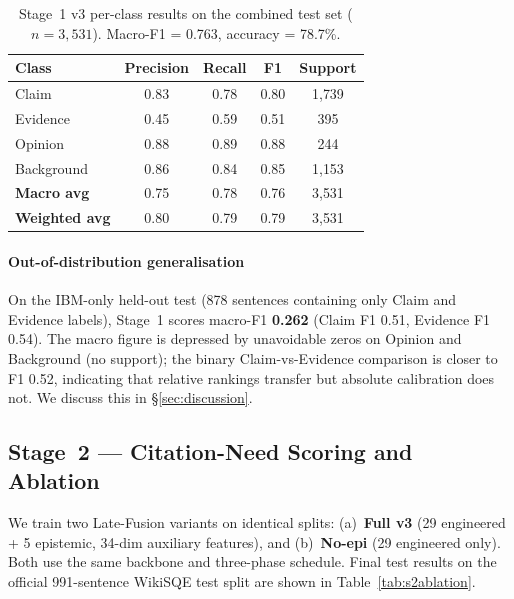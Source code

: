 \documentclass[conference]{IEEEtran}
\begin{document}
\begin{table}[t]
\centering
\caption{Stage~1 v3 per-class results on the combined test set
($n{=}3{,}531$). Macro-F1 = 0.763, accuracy = 78.7\%.}
\label{tab:s1results}
\small
\setlength{\tabcolsep}{6pt}
\begin{tabular}{lcccc}
\toprule
\textbf{Class} & \textbf{Precision} & \textbf{Recall} & \textbf{F1} & \textbf{Support} \\
\midrule
Claim       & 0.83 & 0.78 & 0.80 & 1{,}739 \\
Evidence    & 0.45 & 0.59 & 0.51 &    395 \\
Opinion     & 0.88 & 0.89 & 0.88 &    244 \\
Background  & 0.86 & 0.84 & 0.85 & 1{,}153 \\
\midrule
\textbf{Macro avg}    & 0.75 & 0.78 & 0.76 & 3{,}531 \\
\textbf{Weighted avg} & 0.80 & 0.79 & 0.79 & 3{,}531 \\
\bottomrule
\end{tabular}
\end{table}

\paragraph{Out-of-distribution generalisation}
On the IBM-only held-out test (878 sentences containing only Claim and
Evidence labels), Stage~1 scores macro-F1 \textbf{0.262}
(Claim F1 0.51, Evidence F1 0.54). The macro figure is depressed by
unavoidable zeros on Opinion and Background (no support); the binary
Claim-vs-Evidence comparison is closer to F1 0.52, indicating that
relative rankings transfer but absolute calibration does not. We discuss
this in \S\ref{sec:discussion}.

\subsection{Stage~2 --- Citation-Need Scoring and Ablation}

We train two Late-Fusion variants on identical splits:
(a)~\textbf{Full v3} (29 engineered + 5 epistemic, 34-dim auxiliary
features), and (b)~\textbf{No-epi} (29 engineered only). Both use the
same backbone and three-phase schedule. Final test results on the
official 991-sentence WikiSQE test split are shown in
Table~\ref{tab:s2ablation}.
\end{document}

